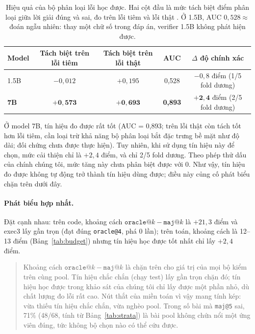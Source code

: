 \begin{table}[htbp]
\centering
\small
\begin{tabular}{@{}l c c c c@{}}
\toprule
Model & Tách biệt trên lỗi tiêm & Tách biệt trên lỗi thật & AUC & $\Delta$ độ chính xác\\
\midrule
1.5B & $-0{,}012$ & $+0{,}195$ & 0,528 & $-0{,}8$ điểm (1/5 fold dương)\\
\textbf{7B} & $\mathbf{+0{,}573}$ & $\mathbf{+0{,}693}$ & \textbf{0,893} & $\mathbf{+2{,}4}$ điểm (2/5 fold dương)\\
\bottomrule
\end{tabular}
\caption{Hiệu quả của bộ phân loại lỗi học được. Hai cột đầu là mức tách biệt điểm phân loại
giữa lời giải đúng và sai, đo trên lỗi tiêm và lỗi thật . Ở 1.5B, AUC $0{,}528 \approx$ đoán ngẫu nhiên: thay một chữ số trong
đáp án, verifier 1.5B không phát hiện được.}
\label{tab:clf}
\end{table}

Ở model 7B, tín hiệu đo được rất tốt (AUC = 0,893; trên lỗi thật còn tách tốt hơn lỗi tiêm, cần loại trừ khả năng bộ phân loại bắt đặc trưng bề mặt như độ dài; đối chứng chưa được thực hiện). Tuy nhiên, khi sử dụng tín hiệu này để chọn, mức cải thiện chỉ là $+2{,}4$ điểm, và chỉ 2/5 fold dương. Theo phép thử dấu của chính chúng tôi, mức tăng này chưa phân biệt được với 0. Như vậy, tín hiệu đo được không tự động trở thành tín hiệu dùng được; điều này củng cố phát biểu chặn trên dưới đây.

\paragraph{Phát biểu hợp nhất.}
Đặt cạnh nhau: trên code, khoảng cách $\texttt{oracle@}k-\texttt{maj@}k$ là $+21{,}3$ điểm và exec3 lấy gần trọn (đạt đúng \texttt{oracle@4}, phá 0 lần); trên toán, khoảng cách là 12--13 điểm (Bảng~\ref{tab:budget}) nhưng tín hiệu học được tốt nhất chỉ lấy $+2{,}4$ điểm.

\begin{quote}
Khoảng cách $\texttt{oracle@}k - \texttt{maj@}k$ là chặn trên cho giá trị của mọi bộ kiểm trên cùng pool. Tín hiệu chắc chắn (chạy test) lấy gần trọn chặn đó; tín hiệu học được trong khảo sát của chúng tôi chỉ lấy được một phần nhỏ, dù chất lượng đo lỗi rất cao. Nút thắt của miền toán vì vậy mang tính kép: vừa thiếu tín hiệu chắc chắn, vừa nghèo pool. Trong số bài mà \texttt{maj@5} sai, 71\% (48/68, tính từ Bảng~\ref{tab:strata}) là bài pool không chứa nổi một ứng viên đúng, tức không bộ chọn nào có thể cứu được.
\end{quote}

